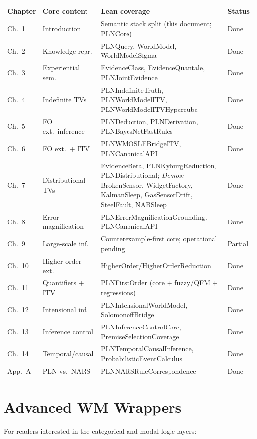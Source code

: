 \documentclass[11pt,openany]{report}
\begin{document}
\begin{longtable}{p{}p{}p{}p{}}
\textbf{Chapter} & \textbf{Core content} & \textbf{Lean coverage} & \textbf{Status} \\
\hline
Ch.\ 1 & Introduction & Semantic stack split (this document; PLNCore) & Done \\
Ch.\ 2 & Knowledge repr. & PLNQuery, WorldModel, WorldModelSigma & Done \\
Ch.\ 3 & Experiential sem. & EvidenceClass, EvidenceQuantale, PLNJointEvidence & Done \\
Ch.\ 4 & Indefinite TVs & PLNIndefiniteTruth, PLNWorldModelITV, PLNWorldModelITVHypercube & Done \\
Ch.\ 5 & FO ext.\ inference & PLNDeduction, PLNDerivation, PLNBayesNetFastRules & Done \\
Ch.\ 6 & FO ext.\ + ITV & PLNWMOSLFBridgeITV, PLNCanonicalAPI & Done \\
Ch.\ 7 & Distributional TVs & EvidenceBeta, PLNKyburgReduction, PLNDistributional; \emph{Demos:} BrokenSensor, WidgetFactory, KalmanSleep, GasSensorDrift, SteelFault, NABSleep & Done \\
Ch.\ 8 & Error magnification & PLNErrorMagnificationGrounding, PLNCanonicalAPI & Done \\
Ch.\ 9 & Large-scale inf. & Counterexample-first core; operational pending & Partial \\
Ch.\ 10 & Higher-order ext. & HigherOrder/HigherOrderReduction & Done \\
Ch.\ 11 & Quantifiers + ITV & PLNFirstOrder (core + fuzzy/QFM + regressions) & Done \\
Ch.\ 12 & Intensional inf. & PLNIntensionalWorldModel, SolomonoffBridge & Done \\
Ch.\ 13 & Inference control & PLNInferenceControlCore, PremiseSelectionCoverage & Done \\
Ch.\ 14 & Temporal/causal & PLNTemporalCausalInference, ProbabilisticEventCalculus & Done \\
App.\ A & PLN vs.\ NARS & PLNNARSRuleCorrespondence & Done \\
\hline
\end{longtable}


\chapter{Advanced WM Wrappers}
\label{app:advanced-wm}

For readers interested in the categorical and modal-logic layers:
\end{document}
